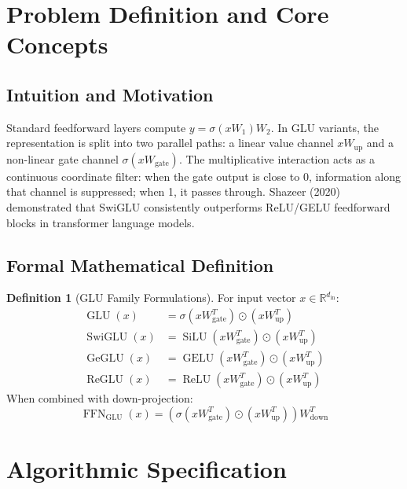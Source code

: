 \documentclass[11pt,a4paper]{article}
\theoremstyle{definition}
\newtheorem{definition}{Definition}[section]
\begin{document}
\section{Problem Definition and Core Concepts}

\subsection{Intuition and Motivation}
Standard feedforward layers compute $y = \sigma(x W_1) W_2$. In GLU variants, the representation is split into two parallel paths: a linear value channel $x W_{\text{up}}$ and a non-linear gate channel $\sigma(x W_{\text{gate}})$. The multiplicative interaction acts as a continuous coordinate filter: when the gate output is close to 0, information along that channel is suppressed; when 1, it passes through. Shazeer (2020) demonstrated that SwiGLU consistently outperforms ReLU/GELU feedforward blocks in transformer language models.

\subsection{Formal Mathematical Definition}
\begin{definition}[GLU Family Formulations]
For input vector $x \in \mathbb{R}^{d_{\text{in}}}$:
\begin{align}
\operatorname{GLU}(x) &= \sigma\left(x W_{\text{gate}}^T\right) \odot \left(x W_{\text{up}}^T\right) \label{eq:glu_classic} \\
\operatorname{SwiGLU}(x) &= \operatorname{SiLU}\left(x W_{\text{gate}}^T\right) \odot \left(x W_{\text{up}}^T\right) \label{eq:swiglu} \\
\operatorname{GeGLU}(x) &= \operatorname{GELU}\left(x W_{\text{gate}}^T\right) \odot \left(x W_{\text{up}}^T\right) \label{eq:geglu} \\
\operatorname{ReGLU}(x) &= \operatorname{ReLU}\left(x W_{\text{gate}}^T\right) \odot \left(x W_{\text{up}}^T\right) \label{eq:reglu}
\end{align}
When combined with down-projection:
\begin{equation}
\operatorname{FFN}_{\text{GLU}}(x) = \left( \sigma\left(x W_{\text{gate}}^T\right) \odot \left(x W_{\text{up}}^T\right) \right) W_{\text{down}}^T \label{eq:ffn_glu}
\end{equation}
\end{definition}

\section{Algorithmic Specification}
\end{document}
